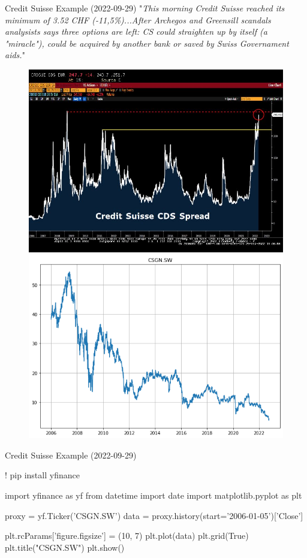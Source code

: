 \documentclass{beamer}
\begin{document}
\begin{frame}{Credit Suisse Example (2022-09-29)}
"\textit{This morning Credit Suisse reached its minimum of 3.52 CHF (-11,5\%)...After Archegos and Greensill scandals analysists says three options are left: CS could straighten up by itself (a "miracle"), could be acquired by another bank or saved by Swiss Governament aids.}"
\begin{figure}[h]
    \begin{center}
    \includegraphics[width=0.45\linewidth]{cds_credit_suisse}\quad
    \includegraphics[width=0.45\linewidth]{price_credit_suisse}
    \end{center}
\end{figure}    
\end{frame}

\begin{frame}[fragile]{Credit Suisse Example (2022-09-29)}
\begin{ipython}
! pip install yfinance
\end{ipython}

\begin{ipython}
import yfinance as yf
from datetime import date
import matplotlib.pyplot as plt

proxy = yf.Ticker('CSGN.SW')
data = proxy.history(start='2006-01-05')['Close']

plt.rcParams['figure.figsize'] = (10, 7)
plt.plot(data)
plt.grid(True)
plt.title("CSGN.SW")
plt.show()
\end{ipython}
\end{frame}
\end{document}

